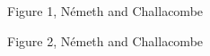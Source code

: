 \documentclass[prl,aps,preprint,superbib,12pt]{revtex4}
\begin{document}
{\begin{center}
Figure 1, N{\'e}meth and Challacombe \\[1.cm]
\end{center}

\clearpage

\begin{center}
Figure 2, N{\'e}meth and Challacombe \\[1.cm]
\end{center}

}
\end{document}
